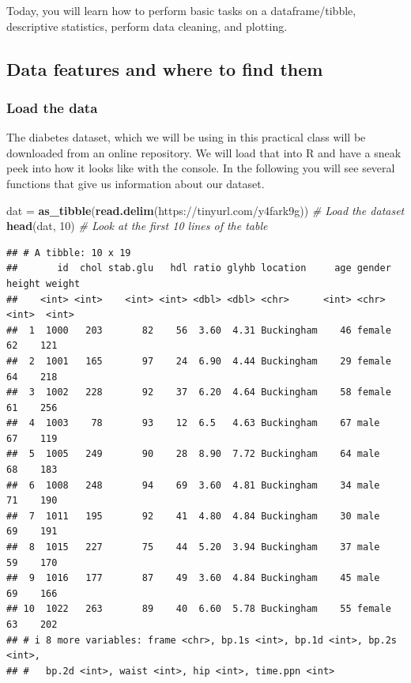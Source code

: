 \documentclass[
]{book}
\newenvironment{Shaded}{\begin{snugshade}}{\end{snugshade}}
\newcommand{\CommentTok}[1]{\textcolor[rgb]{0.56,0.35,0.01}{\textit{#1}}}
\newcommand{\DecValTok}[1]{\textcolor[rgb]{0.00,0.00,0.81}{#1}}
\newcommand{\FunctionTok}[1]{\textcolor[rgb]{0.13,0.29,0.53}{\textbf{#1}}}
\newcommand{\NormalTok}[1]{#1}
\newcommand{\OtherTok}[1]{\textcolor[rgb]{0.56,0.35,0.01}{#1}}
\newcommand{\StringTok}[1]{\textcolor[rgb]{0.31,0.60,0.02}{#1}}
\begin{document}
Today, you will learn how to perform basic tasks on a dataframe/tibble, descriptive statistics, perform data cleaning, and plotting.

\hypertarget{data-features-and-where-to-find-them}{%
\subsection{Data features and where to find them}\label{data-features-and-where-to-find-them}}

\hypertarget{load-the-data}{%
\subsubsection{Load the data}\label{load-the-data}}

The diabetes dataset, which we will be using in this practical class will be downloaded from an online repository.
We will load that into R and have a sneak peek into how it looks like with the console.
In the following you will see several functions that give us information about our dataset.

\begin{Shaded}
\begin{Highlighting}[]
\NormalTok{dat }\OtherTok{=} \FunctionTok{as\_tibble}\NormalTok{(}\FunctionTok{read.delim}\NormalTok{(}\StringTok{\textquotesingle{}https://tinyurl.com/y4fark9g\textquotesingle{}}\NormalTok{)) }\CommentTok{\# Load the dataset}
\FunctionTok{head}\NormalTok{(dat, }\DecValTok{10}\NormalTok{) }\CommentTok{\# Look at the first 10 lines of the table}
\end{Highlighting}
\end{Shaded}

\begin{verbatim}
## # A tibble: 10 x 19
##       id  chol stab.glu   hdl ratio glyhb location     age gender height weight
##    <int> <int>    <int> <int> <dbl> <dbl> <chr>      <int> <chr>   <int>  <int>
##  1  1000   203       82    56  3.60  4.31 Buckingham    46 female     62    121
##  2  1001   165       97    24  6.90  4.44 Buckingham    29 female     64    218
##  3  1002   228       92    37  6.20  4.64 Buckingham    58 female     61    256
##  4  1003    78       93    12  6.5   4.63 Buckingham    67 male       67    119
##  5  1005   249       90    28  8.90  7.72 Buckingham    64 male       68    183
##  6  1008   248       94    69  3.60  4.81 Buckingham    34 male       71    190
##  7  1011   195       92    41  4.80  4.84 Buckingham    30 male       69    191
##  8  1015   227       75    44  5.20  3.94 Buckingham    37 male       59    170
##  9  1016   177       87    49  3.60  4.84 Buckingham    45 male       69    166
## 10  1022   263       89    40  6.60  5.78 Buckingham    55 female     63    202
## # i 8 more variables: frame <chr>, bp.1s <int>, bp.1d <int>, bp.2s <int>,
## #   bp.2d <int>, waist <int>, hip <int>, time.ppn <int>
\end{verbatim}
\end{document}
